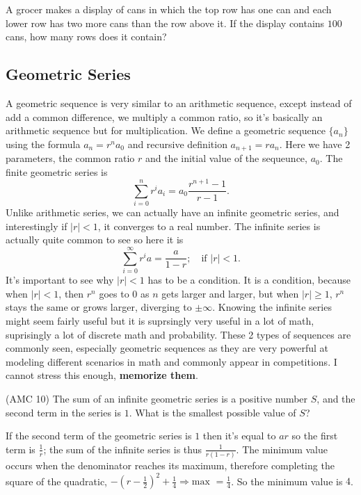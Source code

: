 \documentclass[11pt]{article}
\begin{document}
\begin{exercise}
A grocer makes a display of cans in which the top row has one can and each lower row has two more cans than the row above it. If the display contains $100$ cans, how many rows does it contain?
\end{exercise}

\subsection{Geometric Series}
A geometric sequence is very similar to an arithmetic sequence, except instead of add a common difference, we multiply a common ratio, so it's basically an arithmetic sequence but for multiplication. We define a geometric sequence $\{a_n\}$ using the formula $a_n = r^n a_0$ and recursive definition $a_{n+1} = r a_n$. Here we have 2 parameters, the common ratio $r$ and the initial value of the sequeunce, $a_0$. The finite geometric series is 
\[
    \sum_{i=0}^n r^i a_i = a_0 \frac{r^{n+1} - 1}{r-1}.
\]
Unlike arithmetic series, we can actually have an infinite geometric series, and interestingly if $|r| < 1$, it converges to a real number. The infinite series is actually quite common to see so here it is 
\[
\sum_{i=0}^\infty r^i a = \frac{a}{1-r}; \quad \text{if } |r| < 1.
\]
It's important to see why $|r| < 1$ has to be a condition. It is a condition, because when $|r| < 1$, then $r^n$ goes to 0 as $n$ gets larger and larger, but when $|r| \geq 1$, $r^n$ stays the same or grows larger, diverging to $\pm \infty$. Knowing the infinite series might seem fairly useful but it is suprsingly very useful in a lot of math, suprisingly a lot of discrete math and probability.
These 2 types of sequences are commonly seen, especially geometric sequences as they are very powerful at modeling different scenarios in math and commonly appear in competitions. I cannot stress this enough, \textbf{memorize them}.
\begin{example}{(AMC 10)}
The sum of an infinite geometric series is a positive number $S$, and the second term in the series is $1$. What is the smallest possible value of $S$?
\end{example}
If the second term of the geometric series is $1$ then it's equal to $ar$ so the first term is $\frac{1}{r}$; the sum of the infinite series is thus $\frac{1}{r(1-r)}$. The minimum value occurs when the denominator reaches its maximum, therefore completing the square of the quadratic, $-(r-\frac{1}{2})^2+\frac{1}{4} \Longrightarrow \text{max } = \frac{1}{4}$. So the minimum value is $4$.
\end{document}
